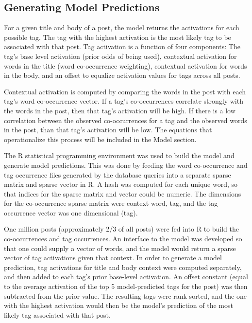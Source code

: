 \documentclass[10pt,letterpaper]{article}
\begin{document}
\subsection{Generating Model Predictions}

For a given title and body of a post, the model returns the activations for each possible tag.
The tag with the highest activation is the most likely tag to be associated with that post.
Tag activation is a function of four components:
The tag's base level activation (prior odds of being used),
contextual activation for words in the title (word co-occurrence weighting),
contextual activation for words in the body,
and an offset to equalize activation values for tags across all posts.

Contextual activation is computed by comparing the words in the post with each tag's word co-occurrence vector.
If a tag's co-occurrences correlate strongly with the words in the post, then that tag's activation will be high.
If there is a low correlation between the observed co-occurrences for a tag and the observed words in the post, than that tag's activation will be low.
The equations that operationalize this process will be included in the Model section.

The R statistical programming environment was used to build the model and generate model predictions.
This was done by feeding the word co-occurrence and tag occurrence files generated by the database queries into a separate sparse matrix and sparse vector in R.
A hash was computed for each unique word, so that indices for the sparse matrix and vector could be numeric.
The dimensions for the co-occurrence sparse matrix were context word, tag, and the tag occurrence vector was one dimensional (tag).

One million posts (approximately 2/3 of all posts) were fed into R to build the co-occurrences and tag occurrences.
An interface to the model was developed so that one could supply a vector of words, and the model would return a sparse vector of tag activations given that context.
In order to generate a model prediction, tag activations for title and body context were computed separately, and then added to each tag's prior base-level activation.
An offset constant (equal to the average activation of the top 5 model-predicted tags for the post) was then subtracted from the prior value.
The resulting tags were rank sorted, and the one with the highest activation would then be the model's prediction of the most likely tag associated with that post.
\end{document}
